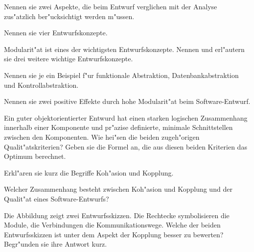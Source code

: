\documentclass[12pt]{exam}
\begin{document}
\begin{questions}
\question[2] Nennen sie zwei Aspekte, die beim Entwurf verglichen mit der Analyse zus"atzlich ber"ucksichtigt werden m"ussen.
\addpoints

\question[4] Nennen sie vier Entwurfskonzepte.
\addpoints

\question[6] Modularit"at ist eines der wichtigsten Entwurfskonzepte. Nennen und erl"autern sie drei weitere wichtige Entwurfskonzepte.
\addpoints

\question[3] Nennen sie je ein Beispiel f"ur funktionale Abstraktion, Datenbankabstraktion und Kontrollabstraktion.
\addpoints

\question[2] Nennen sie zwei positive Effekte durch hohe Modularit"at beim Software-Entwurf.
\addpoints

\question[4] Ein guter objektorientierter Entwurd hat einen starken logischen Zusammenhang innerhalb einer Komponente und pr"azise definierte, minimale Schnittstellen zwischen den Komponenten. Wie hei"sen die beiden zugeh"origen Qualit"atskriterien? Geben sie die Formel an, die aus diesen beiden Kriterien das Optimum berechnet.
\addpoints

\question[2] Erkl"aren sie kurz die Begriffe Koh"asion und Kopplung.
\addpoints

\question[4] Welcher Zusammenhang besteht zwischen Koh"asion und Kopplung und der Qualit"at eines Software-Entwurfs?
\addpoints

\question[2] Die Abbildung zeigt zwei Entwurfsskizzen. Die Rechtecke symbolisieren die Module, die Verbindungen die Kommunikationswege. Welche der beiden Entwurfsskizzen ist unter dem Aspekt der Kopplung besser zu bewerten? Begr"unden sie ihre Antwort kurz.\\
\addpoints
{}
\end{questions}
\end{document}
